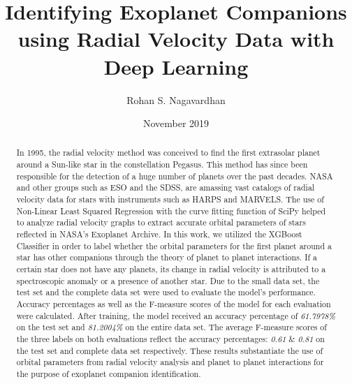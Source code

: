 \documentclass[12pt]{article}
\title{Identifying Exoplanet Companions using Radial Velocity Data with Deep Learning}
\author{Rohan S. Nagavardhan}
\date{November 2019}
\begin{document}
\maketitle

\begin{abstract}
\label{sec:abstract}
In 1995, the radial velocity method was conceived to find the first extrasolar planet around a Sun-like star in the constellation Pegasus. This method has since been responsible for the detection of a huge number of planets over the past decades. NASA and other groups such as ESO and the SDSS, are amassing vast catalogs of radial velocity data for stars with instruments such as HARPS and MARVELS. The use of Non-Linear Least Squared Regression with the curve fitting function of SciPy helped to analyze radial velocity graphs to extract accurate orbital parameters of stars reflected in NASA's Exoplanet Archive. In this work, we utilized the XGBoost Classifier in order to label whether the orbital parameters for the first planet around a star has other companions through the theory of planet to planet interactions. If a certain star does not have any planets, its change in radial velocity is attributed to a spectroscopic anomaly or a presence of another star. Due to the small data set, the test set and the complete data set were used to evaluate the model's performance. Accuracy percentages as well as the F-measure scores of the model for each evaluation were calculated. After training, the model received an accuracy percentage of \emph{61.7978\%} on the test set and \emph{81.2004\%} on the entire data set. The average F-measure scores of the three labels on both evaluations reflect the accuracy percentages: \emph{0.61} \& \emph{0.81} on the test set and complete data set respectively. These results substantiate the use of orbital parameters from radial velocity analysis and planet to planet interactions for the purpose of exoplanet companion identification. 
\end{abstract}
\end{document}
